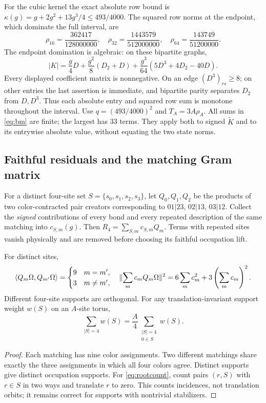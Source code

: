 For the cubic kernel the exact absolute row bound is
$\kappa(g)=g+2g^2+13g^3/4\le493/4000$.
The squared row norms at the endpoint, which dominate the full interval, are
\begin{equation}\label{eq:rowSquares}
 \rho_{16}=\frac{362417}{128000000},\quad
 \rho_{32}=\frac{1443579}{512000000},\quad
 \rho_{64}=\frac{143749}{51200000}.
\end{equation}
The endpoint domination is algebraic: on these bipartite graphs,
\[
 |K|=\frac g4D+\frac{g^2}{8}(D_2+D)
       +\frac{g^3}{64}(5D^3+4D_2-40D).
\]
Every displayed coefficient matrix is nonnegative. On an edge $(D^3)_{rs}\ge8$;
on other entries the last assertion is immediate, and bipartite parity
separates $D_2$ from $D,D^3$. Thus each absolute entry and squared row sum is
monotone throughout the interval. Use $q=(493/4000)^2$ and $T_A=3A\rho_A$. All sums in \eqref{eq:bm} are
finite; the largest has 33 terms. They apply both to signed $\widetilde K$ and
to its entrywise absolute value, without equating the two state norms.

\subsection{Faithful residuals and the matching Gram matrix}
For a distinct four-site set $S=\{s_0,s_1,s_2,s_3\}$, let $Q_0,Q_1,Q_2$ be the
products of two color-contracted pair creators corresponding to
$01|23$, $02|13$, $03|12$. Collect the \emph{signed} contributions of every
bond and every repeated description of the same matching into $c_{S,m}(g)$.
Then $R_4=\sum_{S,m}c_{S,m}Q_m$. Terms with repeated sites vanish physically
and are removed before choosing its faithful occupation lift.

\begin{lemma}\label{lem:gram}
For distinct sites,
\[
 \langle Q_m\Omega,Q_{m'}\Omega\rangle=\begin{cases}9&m=m',\\3&m\ne m',\end{cases}
 \quad
 \lVert \sum_m c_mQ_m\Omega\rVert^2
     =6\sum_m c_m^2+3\left(\sum_m c_m\right)^2.
\]
Different four-site supports are orthogonal. For any translation-invariant
support weight $w(S)$ on an $A$-site torus,
\begin{equation}\label{eq:rootcount}
 \sum_{|S|=4}w(S)=\frac A4\sum_{\substack{|S|=4\\0\in S}}w(S).
\end{equation}
\end{lemma}
\begin{proof}
Each matching has nine color assignments. Two different matchings share exactly
the three assignments in which all four colors agree. Distinct supports give
distinct occupation supports. For \eqref{eq:rootcount}, count pairs $(r,S)$ with
$r\in S$ in two ways and translate $r$ to zero. This counts incidences, not
translation orbits; it remains correct for supports with nontrivial stabilizers.
\end{proof}


